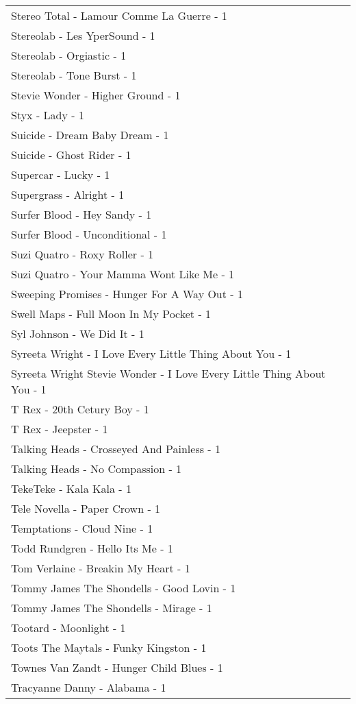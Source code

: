 \documentclass[
]{article}
\begin{document}
\begin{longtable}{l}
Stereo Total - Lamour Comme La Guerre - 1 \\ 
Stereolab - Les YperSound - 1 \\ 
Stereolab - Orgiastic - 1 \\ 
Stereolab - Tone Burst - 1 \\ 
Stevie Wonder - Higher Ground - 1 \\ 
Styx - Lady - 1 \\ 
Suicide - Dream Baby Dream - 1 \\ 
Suicide - Ghost Rider - 1 \\ 
Supercar - Lucky - 1 \\ 
Supergrass - Alright - 1 \\ 
Surfer Blood - Hey Sandy - 1 \\ 
Surfer Blood - Unconditional - 1 \\ 
Suzi Quatro - Roxy Roller - 1 \\ 
Suzi Quatro - Your Mamma Wont Like Me - 1 \\ 
Sweeping Promises - Hunger For A Way Out - 1 \\ 
Swell Maps - Full Moon In My Pocket - 1 \\ 
Syl Johnson - We Did It - 1 \\ 
Syreeta Wright - I Love Every Little Thing About You - 1 \\ 
Syreeta Wright Stevie Wonder - I Love Every Little Thing About You - 1 \\ 
T Rex - 20th Cetury Boy - 1 \\ 
T Rex - Jeepster - 1 \\ 
Talking Heads - Crosseyed And Painless - 1 \\ 
Talking Heads - No Compassion - 1 \\ 
TekeTeke - Kala Kala - 1 \\ 
Tele Novella - Paper Crown - 1 \\ 
Temptations - Cloud Nine - 1 \\ 
Todd Rundgren - Hello Its Me - 1 \\ 
Tom Verlaine - Breakin My Heart - 1 \\ 
Tommy James The Shondells - Good Lovin - 1 \\ 
Tommy James The Shondells - Mirage - 1 \\ 
Tootard - Moonlight - 1 \\ 
Toots The Maytals - Funky Kingston - 1 \\ 
Townes Van Zandt - Hunger Child Blues - 1 \\ 
Tracyanne Danny - Alabama - 1 \\ 

\end{longtable}
\end{document}
